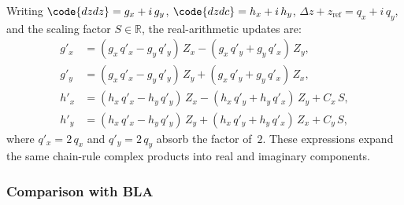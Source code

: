 Writing $\code{dzdz} = g_x + i\,g_y$, $\code{dzdc} = h_x + i\,h_y$,
$\Delta z + z_\mathrm{ref} = q_x + i\,q_y$, and the scaling factor
$S \in \mathbb{R}$, the real-arithmetic updates are:
\begin{align}
g'_x &= (g_x\,q'_x - g_y\,q'_y)\,Z_x
      - (g_x\,q'_y + g_y\,q'_x)\,Z_y, \\
g'_y &= (g_x\,q'_x - g_y\,q'_y)\,Z_y
      + (g_x\,q'_y + g_y\,q'_x)\,Z_x, \\
h'_x &= (h_x\,q'_x - h_y\,q'_y)\,Z_x
      - (h_x\,q'_y + h_y\,q'_x)\,Z_y
      + C_x\,S, \\
h'_y &= (h_x\,q'_x - h_y\,q'_y)\,Z_y
      + (h_x\,q'_y + h_y\,q'_x)\,Z_x
      + C_y\,S,
\end{align}
where $q'_x = 2\,q_x$ and $q'_y = 2\,q_y$ absorb the factor of~$2$.
These expressions expand the same chain-rule complex products into
real and imaginary components.

\subsubsection{Comparison with BLA}
\label{sec:la-vs-bla}


